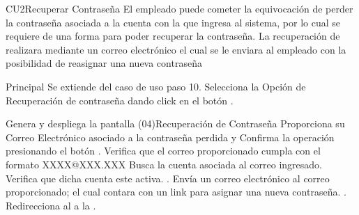 \begin{UseCase}{CU2}{Recuperar Contraseña}{
		El empleado puede cometer la equivocación de perder la contraseña asociada a la cuenta con la que ingresa al sistema, por lo cual se requiere de una forma para poder recuperar la contraseña. La recuperación de realizara mediante un correo electrónico el cual se le enviara al empleado con la posibilidad de reasignar una nueva contraseña
	}

	\end{UseCase}
	\begin{UCtrayectoria}{Principal}
		\UCpaso Se extiende del caso de uso  paso 10.
		\UCpaso[\UCactor] Selecciona la Opción de Recuperación de contraseña dando click en el botón .

		\UCpaso Genera y despliega la pantalla \IUref(04){Recuperación de Contraseña}
		\UCpaso [\UCactor] Proporciona su Correo Electrónico asociado a la contraseña perdida y  Confirma la operación presionando el botón 			.		
		\UCpaso Verifica que el correo proporcionado cumpla con el formato XXXX@XXX.XXX 
		\UCpaso Busca la cuenta asociada al correo ingresado. 
		\UCpaso Verifica que dicha cuenta este activa. .
		\UCpaso Envía un correo electrónico al correo proporcionado; el cual contara con un link para asignar una nueva contraseña. .
		\UCpaso Redirecciona al \UCactor a la  .
	\end{UCtrayectoria}

